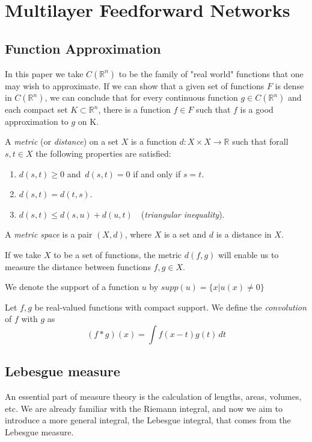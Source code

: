 \documentclass[../main.tex]{subfiles}
\begin{document}
\chapter{Multilayer Feedforward Networks} \label{ch:methods}
\section{Function Approximation}
\noindent In this paper we take $C(\mathbb{R}^n)$ to be the family of "real world" functions that one may wish to approximate. If we can show that a given set of functions $F$ is dense in $C(\mathbb{R}^n)$, we can conclude that for every continuous function $g \in C(\mathbb{R}^n) $ and each compact set $K \subset \mathbb{R}^n$, there is a function $f \in F$ such that $f$ is a good approximation to $g$ on K. 

\begin{definition}\label{thm:first}
	A \emph{metric} (or \emph{distance}) on a set $X$ is a function $d:X\times X\rightarrow \mathbb{R} $ such that forall $s,t\in X$ the following properties are satisfied:
	\begin{enumerate}
		\item $d(s,t) \geq 0$ and $ \, d(s,t)=0$ if and only if $ s=t$.
		\item $d(s,t)=d(t,s)$.
		\item $d(s,t)\leq d(s,u)+d(u,t)\quad$(\emph{triangular inequality}).
	\end{enumerate}
A \emph{metric space} is a pair $(X,d)$, where $X$ is a set and $d$ is a distance in $X$.
\end{definition}
\noindent  If we take $X$ to be a set of functions, the metric $d(f,g)$ will enable us to measure the distance between functions $f,g \in X$.

\begin{definition}
We denote the support of a function $u$ by $supp(u)= \{x | u(x)\neq 0\}$
\end{definition}

\begin{definition}
	Let $f,g$ be real-valued functions with compact support. We define the \emph{convolution} of $f$ with $g$ as $$(f\ast g)(x)=\int f(x-t)g(t) \, dt$$
\end{definition}

\section{Lebesgue measure}
\noindent An essential part of measure theory is the calculation of lengths, areas, volumes, etc. We are already familiar with the Riemann integral, and now we aim to introduce a more general integral, the Lebesgue integral, that comes from the Lebesgue measure. 
\end{document}
